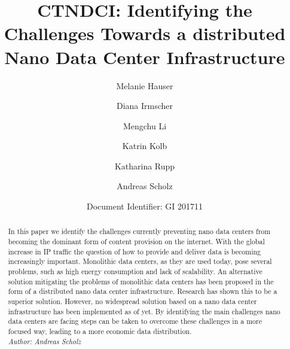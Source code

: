 \documentclass[sigchi-a, authorversion]{acmart}
\begin{document}
\title{CTNDCI: Identifying the Challenges Towards a distributed Nano Data Center Infrastructure}

\author{Melanie Hauser}

\author{Diana Irmscher} 

\author{Mengchu Li}

\author{Katrin Kolb}

\author{Katharina Rupp}

\author{Andreas Scholz}



\author{Document Identifier: GI 201711}
\renewcommand{\shortauthors}{Katrin Kolb et al.}

\begin{abstract}  %
In this paper we identify the challenges currently preventing nano data centers from becoming the dominant form of content provision on the internet. With the global increase in IP traffic the question of how to provide and deliver data is becoming increasingly important. Monolithic data centers, as they are used today, pose several problems, such as high energy consumption and lack of scalability. An alternative solution mitigating the problems of monolithic data centers has been proposed in the form of a distributed nano data center infrastructure. Research has shown this to be a superior solution. However, no widespread solution based on a nano data center infrastructure has been implemented as of yet. By identifying the main challenges nano data centers are facing steps can be taken to overcome these challenges in a more focused way, leading to a more economic data distribution.\\
\textit{Author: Andreas Scholz}\\
\end{abstract}
\end{document}
